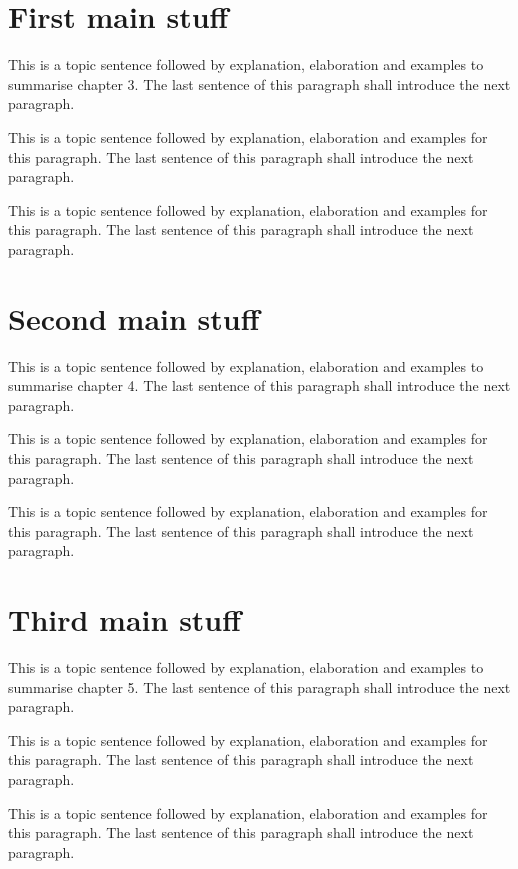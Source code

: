 \section{First main stuff}
\label{sec:ch_6_firstmain}

This is a topic sentence followed by explanation, elaboration and examples to summarise chapter 3. The last sentence of this paragraph shall introduce the next paragraph. \lipsum[1]

This is a topic sentence followed by explanation, elaboration and examples for this paragraph. The last sentence of this paragraph shall introduce the next paragraph. \lipsum[1]

This is a topic sentence followed by explanation, elaboration and examples for this paragraph. The last sentence of this paragraph shall introduce the next paragraph. \lipsum[1]

\section{Second main stuff}
\label{sec:ch_6_secondmain}

This is a topic sentence followed by explanation, elaboration and examples to summarise chapter 4. The last sentence of this paragraph shall introduce the next paragraph. \lipsum[1]

This is a topic sentence followed by explanation, elaboration and examples for this paragraph. The last sentence of this paragraph shall introduce the next paragraph. \lipsum[1]

This is a topic sentence followed by explanation, elaboration and examples for this paragraph. The last sentence of this paragraph shall introduce the next paragraph. \lipsum[1]

\section{Third main stuff}
\label{sec:ch_6_thirdmain}

This is a topic sentence followed by explanation, elaboration and examples to summarise chapter 5. The last sentence of this paragraph shall introduce the next paragraph. \lipsum[1]

This is a topic sentence followed by explanation, elaboration and examples for this paragraph. The last sentence of this paragraph shall introduce the next paragraph. \lipsum[1]

This is a topic sentence followed by explanation, elaboration and examples for this paragraph. The last sentence of this paragraph shall introduce the next paragraph. \lipsum[1]

